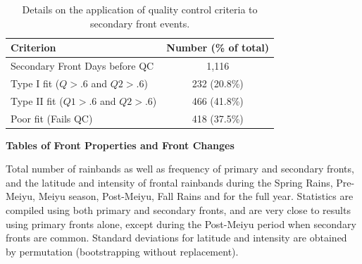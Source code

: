 \documentclass[draft,grl]{agutexSI}
\begin{document}
\begin{article}
\begin{table}
\begin{tabular}{ l c}
\end{tabular}
\end{table}

\begin{table}
\caption{Details on the application of quality control criteria to secondary front events.}
\centering

\begin{tabular}{ l c}
	 Criterion & Number (\% of total) \\
	 \hline
	 Secondary Front Days before QC & 1,116 \\
	 Type I fit ($Q>.6$ and $Q2>.6$) & 232 (20.8\%) \\
	 Type II fit ($Q1>.6$ and $Q2>.6$) & 466 (41.8\%) \\
	 Poor fit (Fails QC) & 418 (37.5\%) \\
	 
\end{tabular}
\end{table}

\noindent\textbf{Tables of Front Properties and Front Changes}

\begin{table}
\caption{Total number of rainbands as well as frequency of primary and secondary fronts, and the latitude and intensity of frontal rainbands during the Spring Rains, Pre-Meiyu, Meiyu season, Post-Meiyu, Fall Rains and for the full year. Statistics are compiled using both primary and secondary fronts, and are very close to results using primary fronts alone, except during the Post-Meiyu period when secondary fronts are common. Standard deviations for latitude and intensity are obtained by permutation (bootstrapping without replacement).}
\centering


\end{table}
\end{article}
\end{document}
